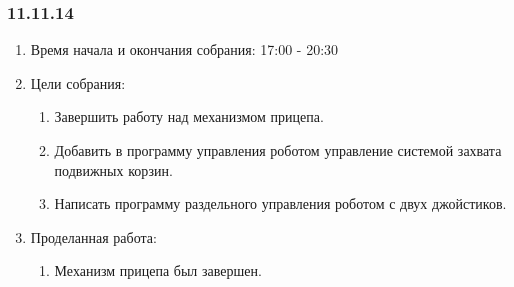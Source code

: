 
\subsubsection{11.11.14}

\begin{enumerate} 
	\item Время начала и окончания собрания:
	17:00 - 20:30
	\item Цели собрания:
	\begin{enumerate}
		\item Завершить работу над механизмом прицепа.
		
		\item Добавить в программу управления роботом управление системой захвата подвижных корзин.
		
		\item Написать программу раздельного управления роботом с двух джойстиков.
		
	\end{enumerate}
	
	\item Проделанная работа:
	\begin{enumerate}
		\item Механизм прицепа был завершен.
		

\end{enumerate}
\end{enumerate}
